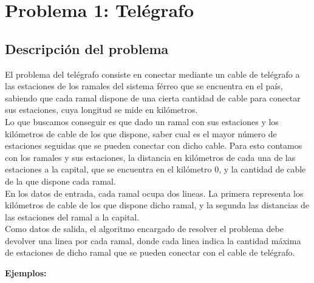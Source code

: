 \documentclass[10pt, a4paper]{article}
\author{Algoritmos y Estructuras de Datos III, DC, UBA.}
\date{}
\title{}
\begin{document}
		
	
	
	
	
	\maketitle
	\tableofcontents
	
	\pagebreak
\section{Problema 1: Tel\'egrafo}
\subsection{Descripci\'on del problema}

El problema del tel\'egrafo consiste en conectar mediante un cable de tel\'egrafo a las estaciones de los ramales del sistema f\'erreo que se encuentra en el pa\'is, sabiendo que cada ramal dispone de una cierta cantidad de cable para conectar sus estaciones, cuya longitud se mide en kil\'ometros. \\
Lo que buscamos conseguir es que dado un ramal con sus estaciones y los kil\'ometros de cable de los que dispone, saber cual es el mayor n\'umero de estaciones seguidas que se pueden conectar con dicho cable. Para esto contamos con los ramales y sus estaciones, la distancia en kil\'ometros de cada una de las estaciones  a la capital, que se encuentra en el kil\'ometro $0$, y la cantidad de cable de la que dispone cada ramal.\\
En los datos de entrada, cada ramal ocupa dos lineas. La primera representa los kil\'ometros de cable de los que dispone dicho ramal, y la segunda las distancias de las estaciones del ramal a la capital.\\
Como datos de salida, el algoritmo encargado de resolver el problema debe devolver una linea por cada ramal, donde cada linea indica la cantidad m\'axima de estaciones de dicho ramal que se pueden conectar con el cable de tel\'egrafo.
\begin{flushleft}
\textbf{Ejemplos:}\\
\end{flushleft}
\end{document}
